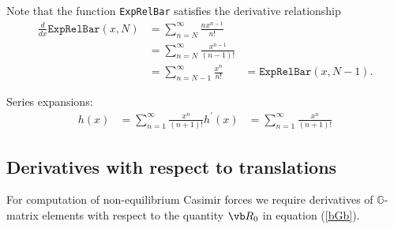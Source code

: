 \documentclass[letterpaper]{article}
\begin{document}
Note that the function \texttt{ExpRelBar} satisfies the 
derivative relationship
\begin{align*}
 \frac{d}{dx} \texttt{ExpRelBar}(x,N)
&= \sum_{n=N}^\infty \frac{n x^{n-1}}{n!} \\
&= \sum_{n=N}^\infty \frac{x^{n-1}}{(n-1)!} \\
&= \sum_{n=N-1}^\infty \frac{x^{n}}{n!}
&= \texttt{ExpRelBar}(x,N-1).
\end{align*}

Series expansions:
\begin{align*}
  h(x)        &= \sum_{n=1}^\infty \frac{x^n}{(n+1)!}   
  h^\prime(x) &= \sum_{n=1}^\infty \frac{x^n}{(n+1)!}   
\end{align*}

\subsection{Derivatives with respect to translations}

For computation of non-equilibrium Casimir forces
we require derivatives of $\mathbb{G}$-matrix
elements with respect to the quantity $\vb R_0$ in
equation (\ref{bGb}). 
\end{document}
